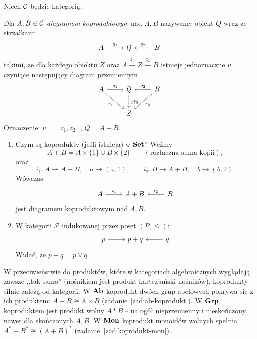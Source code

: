 Niech $\mathcal{C}$ będzie kategorią.

\begin{definicja}
Dla $A, B \in \mathcal{C}$ \emph{diagramem koproduktowym} nad $A, B$ nazywamy obiekt $Q$ wraz ze strzałkami
\[
\begin{tikzcd}
A \arrow[r, "q_1"] & Q & B \arrow[l, "q_2"']
\end{tikzcd}
\]
takimi, że dla każdego obiektu $Z$ oraz $A \xrightarrow{z_1} Z \xleftarrow{z_2} B$ istnieje jednoznaczne $u$ czyniące następujący diagram przemiennym
\[
\begin{tikzcd}
A \arrow[r, "q_1"] \arrow[dr, "z_1"'] & Q \arrow[d, dashed, "\exists! u"] & B \arrow[l, "q_2"'] \arrow[dl, "z_2"] \\
& Z &
\end{tikzcd}
\]
Oznaczenie: $u = [z_1, z_2]$, $Q = A + B$.
\end{definicja}

\begin{przyklad}
\leavevmode
\begin{enumerate}
\item Czym są koprodukty (jeśli istnieją) w $\mathbf{Set}$? Weźmy
\[
A + B = A \times \{1\} \cup B \times \{2\} \qquad (\text{rozłączna suma kopii}),
\]
oraz
\[
i_1 \colon A \to A + B, \quad a \mapsto (a, 1), \qquad i_2 \colon B \to A + B, \quad b \mapsto (b, 2).
\]
Wówczas
\[
\begin{tikzcd}
A \arrow[r, "i_1"] & A + B & B \arrow[l, "i_2"']
\end{tikzcd}
\]
jest diagramem koproduktowym nad $A, B$.

\item W kategorii $\mathcal{P}$ indukowanej przez poset $(P, \leq)$:
\[
\begin{tikzcd}
p \arrow[r] & p + q & q \arrow[l]
\end{tikzcd}
\]
Widać, że $p + q = p \vee q$.
\end{enumerate}
\end{przyklad}

\begin{uwaga}
W przeciwieństwie do produktów, które w kategoriach algebraicznych wyglądają zawsze ,,tak samo'' (nośnikiem jest produkt kartezjański nośników), koprodukty silnie zależą od kategorii. W $\mathbf{Ab}$ koprodukt dwóch grup abelowych pokrywa się z ich produktem: $A + B \cong A \times B$ (zadanie~\ref{zad:ab-koprodukt}). W $\mathbf{Grp}$ koproduktem jest produkt wolny $A * B$ -- na ogół nieprzemienny i nieskończony nawet dla skończonych $A, B$. W $\mathbf{Mon}$ koprodukt monoidów wolnych spełnia $A^* + B^* \cong (A+B)^*$ (zadanie~\ref{zad:koprodukt-mon}).
\end{uwaga}

